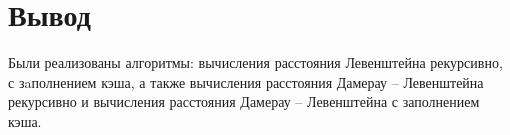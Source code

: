        
        
        
        
        \clearpage
        
        
        
        \clearpage
        
        
        
    \section*{Вывод}
    
        Были реализованы алгоритмы: вычисления расстояния Левенштейна рекурсивно, с зaполнением кэша, а также вычисления расстояния Дамерау – Левенштейна рекурсивно и вычисления расстояния Дамерау – Левенштейна с заполнением кэша.